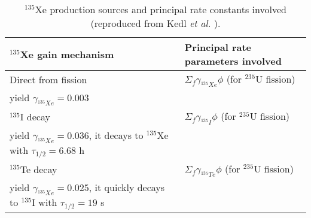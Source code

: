 \begin{table}[ht!]
	\caption{$^{135}$Xe production sources and principal rate constants 
		involved
		(reproduced from Kedl \emph{et al.} \cite{kedl_development_1967}).}
	\centering
	\begin{tabularx}{\textwidth}{b  b}
		\hline \textbf{$^{135}$Xe gain mechanism} & \textbf{Principal rate 
			parameters involved}  	\\ \hline 
		Direct from fission & $\Sigma_f \gamma_{^{135}Xe}\phi$ (for 
		$^{235}$U fission) \\ 
		yield $\gamma_{^{135}Xe}=0.003$ & \\ \hline
		$^{135}$I decay     & $\Sigma_f \gamma_{^{135}I}\phi$ (for 
		$^{235}$U fission) \\
		yield $\gamma_{^{135}Xe}=0.036$, it decays to $^{135}$Xe with 
		$\tau_{1/2}=6.68$ h & 			                    \\		\hline
		$^{135}$Te decay    & $\Sigma_f \gamma_{^{135}Te}\phi$ (for $^{235}$U 
		fission) \\
		yield $\gamma_{^{135}Xe}=0.025$, 
		it quickly decays to $^{135}$I with $\tau_{1/2}=19$ s 
		& 			                    \\	\hline 
	\end{tabularx}
	\label{tab:xe_gain}
\end{table}


